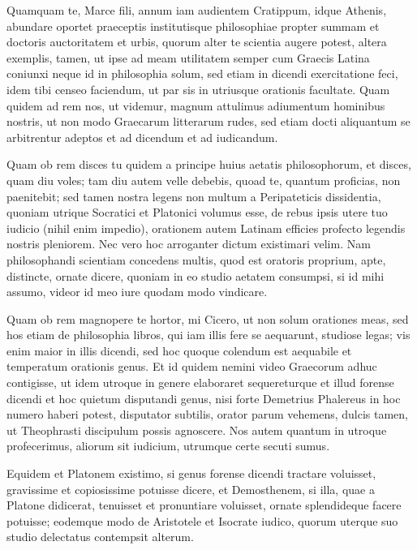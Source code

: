 
 Quamquam te, Marce fili, annum iam audientem Cratippum, idque Athenis, abundare oportet praeceptis institutisque philosophiae propter summam et doctoris auctoritatem et urbis, quorum alter te scientia augere potest, altera exemplis, tamen, ut ipse ad meam utilitatem semper cum Graecis Latina coniunxi neque id in philosophia solum, sed etiam in dicendi exercitatione feci, idem tibi censeo faciendum, ut par sis in utriusque orationis facultate. Quam quidem ad rem nos, ut videmur, magnum attulimus adiumentum hominibus nostris, ut non modo Graecarum litterarum rudes, sed etiam docti aliquantum se arbitrentur adeptos et ad dicendum et ad iudicandum.

 Quam ob rem disces tu quidem a principe huius aetatis philosophorum, et disces, quam diu voles; tam diu autem velle debebis, quoad te, quantum proficias, non paenitebit; sed tamen nostra legens non multum a Peripateticis dissidentia, quoniam utrique Socratici et Platonici volumus esse, de rebus ipsis utere tuo iudicio (nihil enim impedio), orationem autem Latinam efficies profecto legendis nostris pleniorem. Nec vero hoc arroganter dictum existimari velim. Nam philosophandi scientiam concedens multis, quod est oratoris proprium, apte, distincte, ornate dicere, quoniam in eo studio aetatem consumpsi, si id mihi assumo, videor id meo iure quodam modo vindicare.

 

 Quam ob rem magnopere te hortor, mi Cicero, ut non solum orationes meas, sed hos etiam de philosophia libros, qui iam illis fere se aequarunt, studiose legas; vis enim maior in illis dicendi, sed hoc quoque colendum est aequabile et temperatum orationis genus. Et id quidem nemini video Graecorum adhuc contigisse, ut idem utroque in genere elaboraret sequereturque et illud forense dicendi et hoc quietum disputandi genus, nisi forte Demetrius Phalereus in hoc numero haberi potest, disputator subtilis, orator parum vehemens, dulcis tamen, ut Theophrasti discipulum possis agnoscere. Nos autem quantum in utroque profecerimus, aliorum sit iudicium, utrumque certe secuti sumus.
 

 Equidem et Platonem existimo, si genus forense dicendi tractare voluisset, gravissime et copiosissime potuisse dicere, et Demosthenem, si illa, quae a Platone didicerat, tenuisset et pronuntiare voluisset, ornate splendideque facere potuisse; eodemque modo de Aristotele et Isocrate iudico, quorum uterque suo studio delectatus contempsit alterum.

